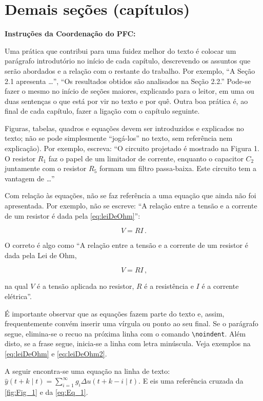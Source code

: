 \chapter{Demais seções (capítulos)}

\textbf{Instruções da Coordenação do PFC:}

Uma prática que contribui para uma fuidez melhor do texto é colocar um parágrafo introdutório no início de cada capítulo, descrevendo os assuntos que serão abordados e a relação com o restante do trabalho. Por exemplo, ``A Seção 2.1 apresenta \ldots'', ``Os resultados obtidos são analisados na Seção 2.2.'' Pode-se fazer o mesmo no início de seções maiores, explicando para o leitor, em uma ou duas sentenças o que está por vir no texto e por quê. Outra boa prática é, ao final de cada capítulo, fazer a ligação com o capítulo seguinte.

Figuras, tabelas, quadros e equações devem ser introduzidos e explicados no texto; não se pode simplesmente ``jogá-los'' no texto, sem referência nem explicação). Por exemplo, escreva: ``O circuito projetado é mostrado na Figura 1. O resistor $R_1$ faz o papel de um limitador de corrente, enquanto o capacitor $C_2$ juntamente com o resistor $R_5$ formam um filtro passa-baixa. Este circuito tem a vantagem de \ldots''

Com relação às equações, não se faz referência a uma equação que ainda não foi apresentada. Por exemplo, não se escreve: ``A relação entre a tensão e a corrente de um resistor é dada pela \autoref{eq:leiDeOhm}'':

\begin{equation}
    V = R I \, \text{.}
    \label{eq:leiDeOhm}
\end{equation}

\noindent O correto é algo como ``A relação entre a tensão e a corrente de um resistor é dada pela Lei de Ohm,

\begin{equation}
    V = R I \, \text{,}
    \label{eq:leiDeOhm2}
\end{equation}

\noindent na qual $V$ é a tensão aplicada no resistor, $R$ é a resistência e $I$ é a corrente elétrica''.

É importante observar que as equações fazem parte do texto e, assim, frequentemente convém inserir uma vírgula ou ponto ao seu final. Se o parágrafo segue, elimina-se o recuo na próxima linha com o comando \verb!\noindent!. Além disto, se a frase segue, inicia-se a linha com letra minúscula. Veja exemplos na \autoref{eq:leiDeOhm} e \autoref{eq:leiDeOhm2}.



A seguir encontra-se uma equação na linha de texto: $\hat{y}(t+k\mid t)= \sum^\infty_{i=1} g_i \Delta u(t+k-i\mid t)$. E eis uma referência cruzada da \autoref{fig:Fig_1} e da \autoref{eq:Eq_1}.